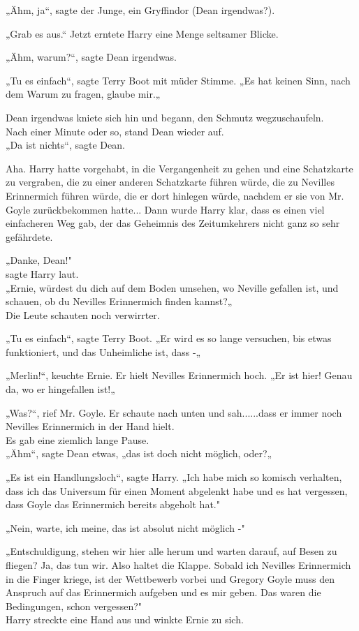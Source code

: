 {„Ähm, ja“, sagte der Junge, ein Gryffindor (Dean irgendwas?).

„Grab es aus.“ Jetzt erntete Harry eine Menge seltsamer Blicke.

„Ähm, warum?“, sagte Dean irgendwas.

„Tu es einfach“, sagte Terry Boot mit müder Stimme. „Es hat keinen Sinn, nach dem Warum zu fragen, glaube mir.„

Dean irgendwas kniete sich hin und begann, den Schmutz wegzuschaufeln.\\ Nach einer Minute oder so, stand Dean wieder auf.\\ „Da ist nichts“, sagte Dean.

Aha. Harry hatte vorgehabt, in die Vergangenheit zu gehen und eine Schatzkarte zu vergraben, die zu einer anderen Schatzkarte führen würde, die zu Nevilles Erinnermich führen würde, die er dort hinlegen würde, nachdem er sie von Mr. Goyle zurückbekommen hatte... Dann wurde Harry klar, dass es einen viel einfacheren Weg gab, der das Geheimnis des Zeitumkehrers nicht ganz so sehr gefährdete.

„Danke, Dean!"\\ sagte Harry laut.\\ „Ernie, würdest du dich auf dem Boden umsehen, wo Neville gefallen ist, und schauen, ob du Nevilles Erinnermich finden kannst?„\\ Die Leute schauten noch verwirrter.

„Tu es einfach“, sagte Terry Boot. „Er wird es so lange versuchen, bis etwas funktioniert, und das Unheimliche ist, dass -„

„Merlin!“, keuchte Ernie. Er hielt Nevilles Erinnermich hoch. „Er ist hier! Genau da, wo er hingefallen ist!„

„Was?“, rief Mr. Goyle. Er schaute nach unten und sah......dass er immer noch Nevilles Erinnermich in der Hand hielt.\\ Es gab eine ziemlich lange Pause.\\ „Ähm“, sagte Dean etwas, „das ist doch nicht möglich, oder?„

„Es ist ein Handlungsloch“, sagte Harry. „Ich habe mich so komisch verhalten, dass ich das Universum für einen Moment abgelenkt habe und es hat vergessen, dass Goyle das Erinnermich bereits abgeholt hat."

„Nein, warte, ich meine, das ist absolut nicht möglich -"

„Entschuldigung, stehen wir hier alle herum und warten darauf, auf Besen zu fliegen? Ja, das tun wir. Also haltet die Klappe. Sobald ich Nevilles Erinnermich in die Finger kriege, ist der Wettbewerb vorbei und Gregory Goyle muss den Anspruch auf das Erinnermich aufgeben und es mir geben. Das waren die Bedingungen, schon vergessen?"\\ Harry streckte eine Hand aus und winkte Ernie zu sich.

}
